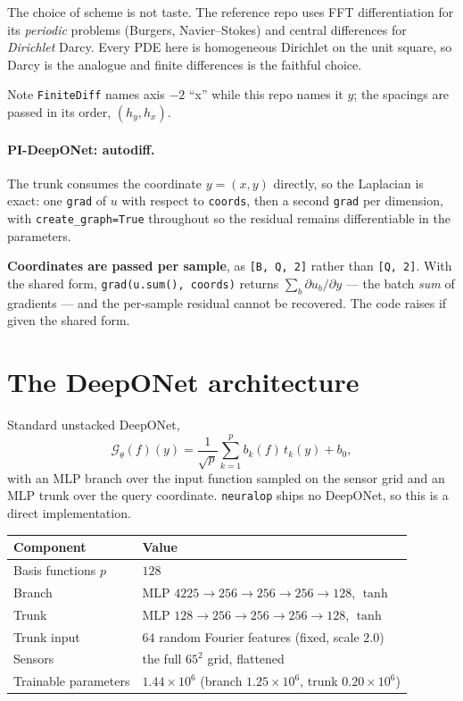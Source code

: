 \documentclass[11pt]{article}
\begin{document}
The choice of scheme is not taste. The reference repo uses FFT differentiation for its
\emph{periodic} problems (Burgers, Navier--Stokes) and central differences for \emph{Dirichlet}
Darcy. Every PDE here is homogeneous Dirichlet on the unit square, so Darcy is the analogue and
finite differences is the faithful choice.

Note \texttt{FiniteDiff} names axis $-2$ ``x'' while this repo names it $y$; the spacings are passed
in its order, $(h_y, h_x)$.

\paragraph{PI-DeepONet: autodiff.} The trunk consumes the coordinate $y=(x,y)$ directly, so the
Laplacian is exact: one \texttt{grad} of $u$ with respect to \texttt{coords}, then a second
\texttt{grad} per dimension, with \texttt{create\_graph=True} throughout so the residual remains
differentiable in the parameters.

\textbf{Coordinates are passed per sample}, as \texttt{[B, Q, 2]} rather than \texttt{[Q, 2]}. With
the shared form, \texttt{grad(u.sum(), coords)} returns $\sum_b \partial u_b/\partial y$ --- the
batch \emph{sum} of gradients --- and the per-sample residual cannot be recovered. The code raises
if given the shared form.

\section*{The DeepONet architecture}

Standard unstacked DeepONet,
\begin{equation*}
   \mathcal G_\theta(f)(y) = \frac{1}{\sqrt{p}}\sum_{k=1}^{p} b_k(f)\,t_k(y) + b_0 ,
\end{equation*}
with an MLP branch over the input function sampled on the sensor grid and an MLP trunk over the
query coordinate. \texttt{neuralop} ships no DeepONet, so this is a direct implementation.

\begin{center}
\begin{tabular}{ll}
\toprule
\textbf{Component} & \textbf{Value} \\
\midrule
Basis functions $p$      & $128$ \\
Branch                   & MLP $4225 \to 256 \to 256 \to 256 \to 128$, $\tanh$ \\
Trunk                    & MLP $128 \to 256 \to 256 \to 256 \to 128$, $\tanh$ \\
Trunk input              & $64$ random Fourier features (fixed, scale $2.0$) \\
Sensors                  & the full $65^2$ grid, flattened \\
Trainable parameters     & $1.44\times10^{6}$ (branch $1.25\times10^{6}$, trunk $0.20\times10^{6}$) \\
\bottomrule
\end{tabular}
\end{center}
\end{document}
